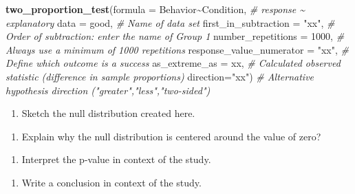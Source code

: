\documentclass[
]{report}
\newenvironment{Shaded}{\begin{snugshade}}{\end{snugshade}}
\newcommand{\AttributeTok}[1]{\textcolor[rgb]{0.13,0.29,0.53}{#1}}
\newcommand{\CommentTok}[1]{\textcolor[rgb]{0.56,0.35,0.01}{\textit{#1}}}
\newcommand{\DecValTok}[1]{\textcolor[rgb]{0.00,0.00,0.81}{#1}}
\newcommand{\FunctionTok}[1]{\textcolor[rgb]{0.13,0.29,0.53}{\textbf{#1}}}
\newcommand{\NormalTok}[1]{#1}
\newcommand{\SpecialCharTok}[1]{\textcolor[rgb]{0.81,0.36,0.00}{\textbf{#1}}}
\newcommand{\StringTok}[1]{\textcolor[rgb]{0.31,0.60,0.02}{#1}}
\providecommand{\tightlist}{%
  \setlength{\itemsep}{0pt}\setlength{\parskip}{0pt}}
\begin{document}
\begin{Shaded}
\begin{Highlighting}[]
\FunctionTok{two\_proportion\_test}\NormalTok{(}\AttributeTok{formula =}\NormalTok{ Behavior}\SpecialCharTok{\textasciitilde{}}\NormalTok{Condition, }\CommentTok{\# response \textasciitilde{} explanatory}
    \AttributeTok{data =}\NormalTok{ good, }\CommentTok{\# Name of data set}
    \AttributeTok{first\_in\_subtraction =} \StringTok{"xx"}\NormalTok{, }\CommentTok{\# Order of subtraction: enter the name of Group 1}
    \AttributeTok{number\_repetitions =} \DecValTok{1000}\NormalTok{, }\CommentTok{\# Always use a minimum of 1000 repetitions}
    \AttributeTok{response\_value\_numerator =} \StringTok{"xx"}\NormalTok{, }\CommentTok{\# Define which outcome is a success}
    \AttributeTok{as\_extreme\_as =}\NormalTok{ xx, }\CommentTok{\# Calculated observed statistic (difference in sample proportions)}
    \AttributeTok{direction=}\StringTok{"xx"}\NormalTok{) }\CommentTok{\# Alternative hypothesis direction ("greater","less","two{-}sided")}
\end{Highlighting}
\end{Shaded}

\begin{enumerate}
\def\labelenumi{\arabic{enumi}.}
\setcounter{enumi}{8}
\tightlist
\item
  Sketch the null distribution created here.
\end{enumerate}

\vspace{1.5in}

\begin{enumerate}
\def\labelenumi{\arabic{enumi}.}
\setcounter{enumi}{9}
\tightlist
\item
  Explain why the null distribution is centered around the value of zero?
\end{enumerate}

\vspace{.8in}

\begin{enumerate}
\def\labelenumi{\arabic{enumi}.}
\setcounter{enumi}{10}
\tightlist
\item
  Interpret the p-value in context of the study.
\end{enumerate}

\vspace{1in}

\begin{enumerate}
\def\labelenumi{\arabic{enumi}.}
\setcounter{enumi}{11}
\tightlist
\item
  Write a conclusion in context of the study.
\end{enumerate}
\end{document}

